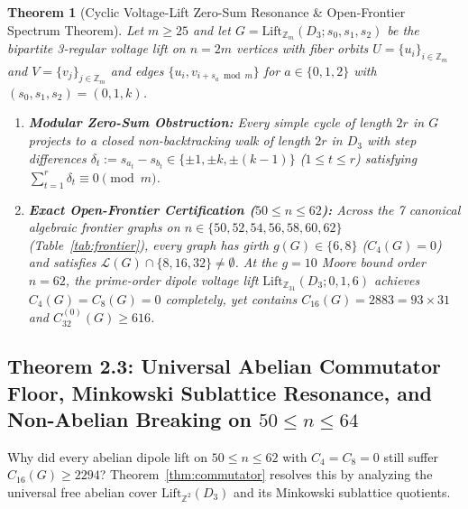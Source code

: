 \documentclass[10pt,a4paper]{article}
\newtheorem{theorem}{Theorem}[section]
\theoremstyle{definition}
\theoremstyle{remark}
\begin{document}
\begin{theorem}[Cyclic Voltage-Lift Zero-Sum Resonance \& Open-Frontier Spectrum Theorem]\label{thm:frontier}
Let $m \ge 25$ and let $G = \mathrm{Lift}_{\mathbb{Z}_m}(D_3; s_0, s_1, s_2)$ be the bipartite 3-regular voltage lift on $n = 2m$ vertices with fiber orbits $U = \{u_i\}_{i \in \mathbb{Z}_m}$ and $V = \{v_j\}_{j \in \mathbb{Z}_m}$ and edges $\{u_i, v_{i + s_a \bmod m}\}$ for $a \in \{0, 1, 2\}$ with $(s_0, s_1, s_2) = (0, 1, k)$.
\begin{enumerate}[label=(\alph*),nosep]
  \item \textbf{Modular Zero-Sum Obstruction:} Every simple cycle of length $2r$ in $G$ projects to a closed non-backtracking walk of length $2r$ in $D_3$ with step differences $\delta_t := s_{a_t} - s_{b_t} \in \{\pm 1, \pm k, \pm(k-1)\}$ ($1 \le t \le r$) satisfying $\sum_{t=1}^{r} \delta_t \equiv 0 \pmod{m}$.
  \item \textbf{Exact Open-Frontier Certification ($50 \le n \le 62$):} Across the 7 canonical algebraic frontier graphs on $n \in \{50, 52, 54, 56, 58, 60, 62\}$ (Table~\ref{tab:frontier}), every graph has girth $g(G) \in \{6, 8\}$ ($C_4(G) = 0$) and satisfies $\mathcal{L}(G) \cap \{8, 16, 32\} \ne \emptyset$. At the $g=10$ Moore bound order $n = 62$, the prime-order dipole voltage lift $\mathrm{Lift}_{\mathbb{Z}_{31}}(D_3; 0, 1, 6)$ achieves $C_4(G) = C_8(G) = 0$ completely, yet contains $C_{16}(G) = 2883 = 93 \times 31$ and $C_{32}^{(0)}(G) \ge 616$.
\end{enumerate}
\end{theorem}

\subsection{Theorem 2.3: Universal Abelian Commutator Floor, Minkowski Sublattice Resonance, and Non-Abelian Breaking on $50 \le n \le 64$}

Why did every abelian dipole lift on $50 \le n \le 62$ with $C_4 = C_8 = 0$ still suffer $C_{16}(G) \ge 2294$? Theorem~\ref{thm:commutator} resolves this by analyzing the universal free abelian cover $\mathrm{Lift}_{\mathbb{Z}^2}(D_3)$ and its Minkowski sublattice quotients.
\end{document}
